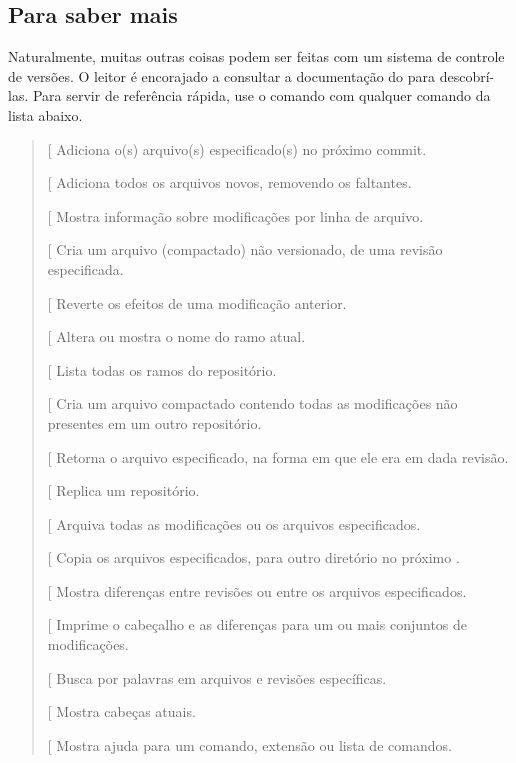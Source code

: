 \documentclass[a4paper,10pt,portuguese]{sphinxmanual}
\begin{document}
\subsection{Para saber mais}
\label{capferr:para-saber-mais}
Naturalmente, muitas outras coisas podem ser feitas com um sistema
de controle de versões. O leitor é encorajado a consultar a
documentação do  para descobrí-las. Para servir de
referência rápida, use o comando  com
qualquer comando da lista abaixo.
\begin{quote}

{[}\code{add}{]} Adiciona o(s) arquivo(s) especificado(s) no próximo
commit.

{[}\code{addremove}{]} Adiciona todos os arquivos novos, removendo os
faltantes.

{[}\code{annotate}{]} Mostra informação sobre modificações por linha de
arquivo.

{[}\code{archive}{]} Cria um arquivo (compactado) não versionado, de uma
revisão especificada.

{[}\code{backout}{]} Reverte os efeitos de uma modificação anterior.

{[}\code{branch}{]} Altera ou mostra o nome do ramo atual.

{[}\code{branches}{]} Lista todas os ramos do repositório.

{[}\code{bundle}{]} Cria um arquivo compactado contendo todas as
modificações não presentes em um outro repositório.

{[}\code{cat}{]} Retorna o arquivo especificado, na forma em que ele era
em dada revisão.

{[}\code{clone}{]} Replica um repositório.

{[}\code{commit}{]} Arquiva todas as modificações ou os arquivos
especificados.

{[}\code{copy}{]} Copia os arquivos especificados, para outro diretório no
próximo .

{[}\code{diff}{]} Mostra diferenças entre revisões ou entre os arquivos
especificados.

{[}\code{export}{]} Imprime o cabeçalho e as diferenças para um ou mais
conjuntos de modificações.

{[}\code{grep}{]} Busca por palavras em arquivos e revisões específicas.

{[}\code{heads}{]} Mostra cabeças atuais.

{[}\code{help}{]} Mostra ajuda para um comando, extensão ou lista de
comandos.


\end{quote}
\end{document}
